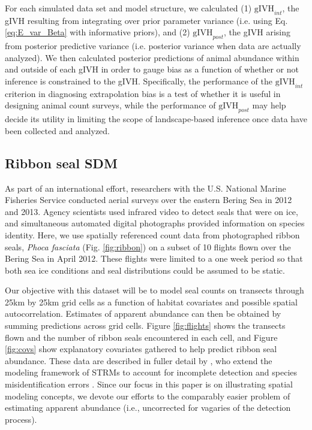 \documentclass[12pt,english]{article}
\begin{document}
\begin{spacing}{1.9}
For each simulated data set and model structure, we calculated (1) $\text{gIVH}_{int}$, the gIVH resulting from integrating over prior parameter variance (i.e. using Eq. \ref{eq:E_var_Beta} with informative priors), and (2) $\text{gIVH}_{post}$, the gIVH arising from posterior predictive variance (i.e. posterior variance when data are actually analyzed).  We then calculated posterior predictions of animal abundance within and outside of each gIVH in order to gauge bias as a function of whether or not inference is constrained to the gIVH.  Specifically, the performance of the $\text{gIVH}_{int}$ criterion in diagnosing extrapolation bias is a test of whether it is useful in designing animal count surveys, while the performance of $\text{gIVH}_{post}$ may help decide its utility in limiting the scope of landscape-based inference once data have been collected and analyzed.





\subsection{Ribbon seal SDM}
As part of an international effort, researchers with the U.S. National Marine Fisheries Service conducted aerial surveys over the eastern Bering Sea in 2012 and 2013.  Agency scientists used infrared video to detect seals that were on ice, and simultaneous automated digital photographs provided information on species identity. Here, we use spatially referenced count data from photographed ribbon seals, {\it Phoca fasciata} (Fig. \ref{fig:ribbon}) on a subset of 10 flights flown over the Bering Sea in April 2012.  These flights were limited to a one week period so that both sea ice conditions and seal distributions could be assumed to be static.

Our objective with this dataset will be to model seal counts on transects through 25km by 25km grid cells as a function of habitat covariates and possible spatial autocorrelation. Estimates of apparent abundance can then be obtained by summing predictions across grid cells. Figure \ref{fig:flights} shows the transects flown and the number of ribbon seals encountered in each cell, and Figure \ref{fig:covs} show explanatory covariates gathered to help predict ribbon seal abundance.  These data are described in fuller detail by \citet{ConnEtAl2014}, who extend the modeling framework of STRMs to account for incomplete detection and species misidentification errors \citep[see e.g.][]{ConnEtAl2014}.  Since our focus in this paper is on illustrating spatial modeling concepts, we devote our efforts to the comparably easier problem of estimating apparent abundance (i.e., uncorrected for vagaries of the detection process).


\end{spacing}
\end{document}
